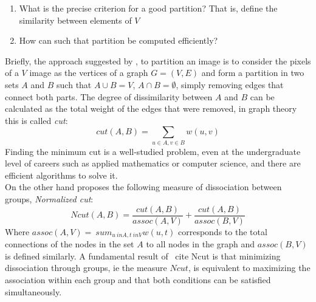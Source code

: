 \documentclass[conference]{IEEEtran}
\begin{document}
\begin{enumerate}
\item What is the precise criterion for a good partition? That is, define the similarity between elements of $ V $
\item How can such that partition be computed efficiently?
\end{enumerate}  
Briefly, the approach suggested by \cite{Ncut}, to partition an image is to consider the pixels of a $ V $ image as the vertices of a graph $ G = (V, E) $ and form a partition in two sets $ A $ and $ B $ such that $ A \cup B = V $, $ A \cap B = \emptyset $, simply removing edges that connect both parts. The degree of dissimilarity between $ A $ and $ B $ can be calculated as the total weight of the edges that were removed, in graph theory this is called \textit{cut}:
\[
cut (A, B) = \sum_{u \in A, v \in B} w (u, v)
\]
Finding the minimum cut is a well-studied problem, even at the undergraduate level of careers such as applied mathematics or computer science, and there are efficient algorithms to solve it. \\
On the other hand \cite{Ncut} proposes the following measure of dissociation between groups, \textit{Normalized cut}:
\[
Ncut (A, B) = \frac {cut (A, B)} {assoc (A, V)} + \frac {cut (A, B)} {assoc (B, V)}
\]
Where $ assoc (A, V) = \ sum_ {u \ in A, t \ in V} w (u, t) $ corresponds to the total connections of the nodes in the set $ A $ to all nodes in the graph and $ assoc (B, V) $ is defined similarly. A fundamental result of \ cite {Ncut} is that minimizing dissociation through groups, ie the measure $ Ncut $, is equivalent to maximizing the association within each group and that both conditions can be satisfied simultaneously.
\end{document}
